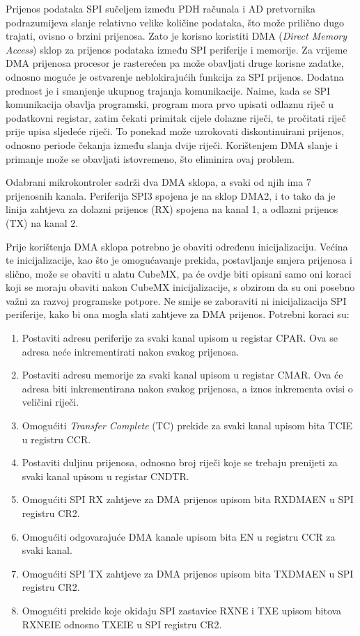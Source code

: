 		Prijenos podataka SPI sučeljem između PDH računala i AD pretvornika podrazumijeva slanje relativno velike količine podataka, što može prilično dugo trajati, ovisno o brzini prijenosa. Zato je korisno koristiti DMA (\textit{Direct Memory Access}) sklop za prijenos podataka između SPI periferije i memorije. Za vrijeme DMA prijenosa procesor je rasterećen pa može obavljati druge korisne zadatke, odnosno moguće je ostvarenje neblokirajućih funkcija za SPI prijenos. Dodatna prednost je i smanjenje ukupnog trajanja komunikacije. Naime, kada se SPI komunikacija obavlja programski, program mora prvo upisati odlaznu riječ u podatkovni registar, zatim čekati primitak cijele dolazne riječi, te pročitati riječ prije upisa sljedeće riječi. To ponekad može uzrokovati diskontinuirani prijenos, odnosno periode čekanja između slanja dvije riječi. \cite[str.~890]{stm32f4_manual} Korištenjem DMA slanje i primanje može se obavljati istovremeno, što eliminira ovaj problem.
		
		Odabrani mikrokontroler sadrži dva DMA sklopa, a svaki od njih ima 7 prijenosnih kanala. Periferija SPI3 spojena je na sklop DMA2, i to tako da je linija zahtjeva za dolazni prijenos (RX) spojena na kanal 1, a odlazni prijenos (TX) na kanal 2. 
		
		Prije korištenja DMA sklopa potrebno je obaviti određenu inicijalizaciju. Većina te inicijalizacije, kao što je omogućavanje prekida, postavljanje smjera prijenosa i slično, može se obaviti u alatu CubeMX, pa će ovdje biti opisani samo oni koraci koji se moraju obaviti nakon CubeMX inicijalizacije, s obzirom da su oni posebno važni za razvoj programske potpore. Ne smije se zaboraviti ni inicijalizacija SPI periferije, kako bi ona mogla slati zahtjeve za DMA prijenos. Potrebni koraci su:
		\begin{enumerate}
			\item Postaviti adresu periferije za svaki kanal upisom u registar CPAR. Ova se adresa neće inkrementirati nakon svakog prijenosa.
			\item Postaviti adresu memorije za svaki kanal upisom u registar CMAR. Ova će adresa biti inkrementirana nakon svakog prijenosa, a iznos inkrementa ovisi o veličini riječi.
			\item Omogućiti \textit{Transfer Complete} (TC) prekide za svaki kanal upisom bita TCIE u registru CCR.
			\item Postaviti duljinu prijenosa, odnosno broj riječi koje se trebaju prenijeti za svaki kanal upisom u registar CNDTR.
			\item Omogućiti SPI RX zahtjeve za DMA prijenos upisom bita RXDMAEN u SPI registru CR2.
			\item Omogućiti odgovarajuće DMA kanale upisom bita EN u registru CCR za svaki kanal.
			\item Omogućiti SPI TX zahtjeve za DMA prijenos upisom bita TXDMAEN u SPI registru CR2.
			\item Omogućiti prekide koje okidaju SPI zastavice RXNE i TXE upisom bitova RXNEIE odnosno TXEIE u SPI registru CR2.
		\end{enumerate}
		
